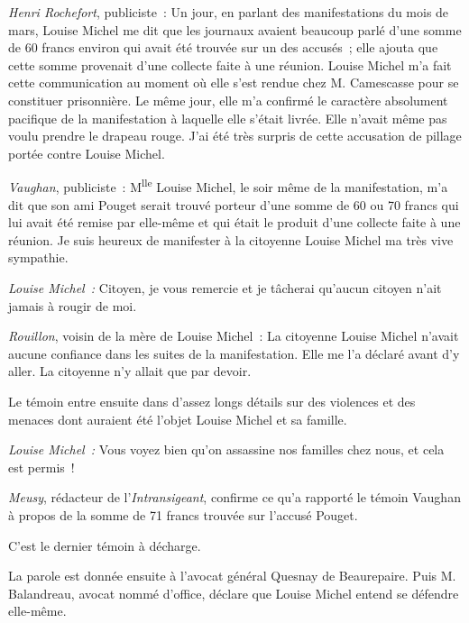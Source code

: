 \documentclass[french,twoside]{book} %
\def\mednobreak{\ifdim\lastskip<\medskipamount
  \removelastskip\nopagebreak\medskip\fi}
\newcommand{\labelblock}[1]{\medbreak{\noindent\color{rubric}\bfseries #1}\par\mednobreak}
\begin{document}
\emph{Henri Rochefort}, publiciste : Un jour, en parlant des manifestations du mois de mars, Louise Michel me dit que les journaux avaient beaucoup parlé d’une somme de 60 francs environ qui avait été trouvée sur un des accusés ; elle ajouta que cette somme provenait d’une collecte faite à une réunion. Louise Michel m’a fait cette communication au moment où elle s’est rendue chez M. Camescasse pour se constituer prisonnière. Le même jour, elle m’a confirmé le caractère absolument pacifique de la manifestation à laquelle elle s’était livrée. Elle n’avait même pas voulu prendre le drapeau rouge. J’ai été très surpris de cette accusation de pillage portée contre Louise Michel.\par
\emph{Vaughan}, publiciste : M\textsuperscript{lle} Louise Michel, le soir même de la manifestation, m’a dit que son ami Pouget serait trouvé porteur d’une somme de 60 ou 70 francs qui lui avait été remise par elle-même et qui était le produit d’une collecte faite à une réunion. Je suis heureux de manifester à la citoyenne Louise Michel ma très vive sympathie.\par
\emph{Louise Michel :} Citoyen, je vous remercie et je tâcherai qu’aucun citoyen n’ait jamais à rougir de moi.\par
\emph{Rouillon}, voisin de la mère de Louise Michel : La citoyenne Louise Michel n’avait aucune confiance dans les suites de la manifestation. Elle me l’a déclaré avant d’y aller. La citoyenne n’y allait que par devoir.\par
\bigbreak
\noindent Le témoin entre ensuite dans d’assez longs détails sur des violences et des menaces dont auraient été l’objet Louise Michel et sa famille.\par
\bigbreak
\noindent \emph{Louise Michel :} Vous voyez bien qu’on assassine nos familles chez nous, et cela est permis !\par
\emph{Meusy}, rédacteur de l’\emph{Intransigeant}, confirme ce qu’a rapporté le témoin Vaughan à propos de la somme de 71 francs trouvée sur l’accusé Pouget.\par
 C’est le dernier témoin à décharge.\par
\bigbreak
\noindent La parole est donnée ensuite à l’avocat général Quesnay de Beaurepaire. Puis M. Balandreau, avocat nommé d’office, déclare que Louise Michel entend se défendre elle-même.\par

\labelblock{plaidoirie de louise michel}
\end{document}

